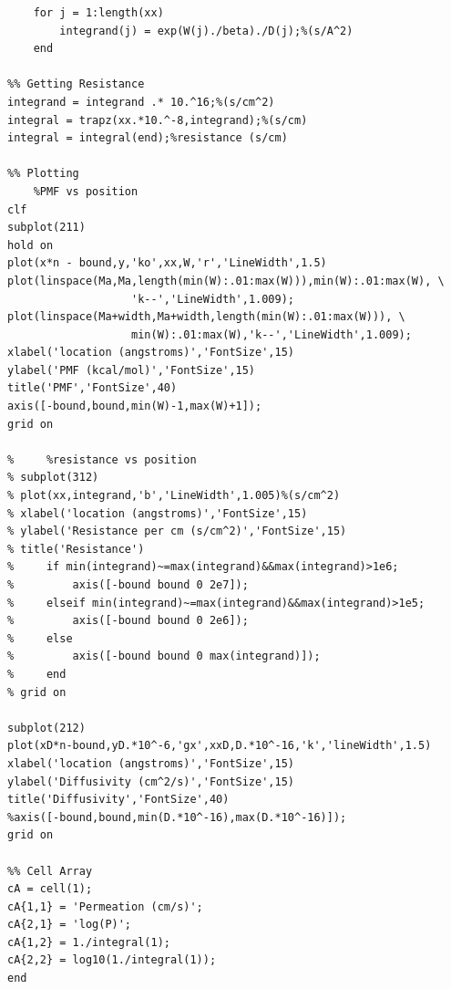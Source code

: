 \documentclass[usetitle=true,journal=jcisd8,manuscript=suppinfo,biochem=true]{achemso}
\begin{document}
\begin{verbatim}
    for j = 1:length(xx)
        integrand(j) = exp(W(j)./beta)./D(j);%(s/A^2)
    end

%% Getting Resistance    
integrand = integrand .* 10.^16;%(s/cm^2)
integral = trapz(xx.*10.^-8,integrand);%(s/cm)
integral = integral(end);%resistance (s/cm)

%% Plotting
    %PMF vs position
clf
subplot(211)
hold on
plot(x*n - bound,y,'ko',xx,W,'r','LineWidth',1.5)
plot(linspace(Ma,Ma,length(min(W):.01:max(W))),min(W):.01:max(W), \
                   'k--','LineWidth',1.009);
plot(linspace(Ma+width,Ma+width,length(min(W):.01:max(W))), \
                   min(W):.01:max(W),'k--','LineWidth',1.009);
xlabel('location (angstroms)','FontSize',15)
ylabel('PMF (kcal/mol)','FontSize',15)
title('PMF','FontSize',40)
axis([-bound,bound,min(W)-1,max(W)+1]);
grid on

%     %resistance vs position
% subplot(312)
% plot(xx,integrand,'b','LineWidth',1.005)%(s/cm^2)
% xlabel('location (angstroms)','FontSize',15)
% ylabel('Resistance per cm (s/cm^2)','FontSize',15)
% title('Resistance')
%     if min(integrand)~=max(integrand)&&max(integrand)>1e6;
%         axis([-bound bound 0 2e7]);
%     elseif min(integrand)~=max(integrand)&&max(integrand)>1e5;
%         axis([-bound bound 0 2e6]);
%     else
%         axis([-bound bound 0 max(integrand)]);
%     end
% grid on

subplot(212)
plot(xD*n-bound,yD.*10^-6,'gx',xxD,D.*10^-16,'k','lineWidth',1.5)
xlabel('location (angstroms)','FontSize',15)
ylabel('Diffusivity (cm^2/s)','FontSize',15)
title('Diffusivity','FontSize',40)
%axis([-bound,bound,min(D.*10^-16),max(D.*10^-16)]);
grid on

%% Cell Array
cA = cell(1);
cA{1,1} = 'Permeation (cm/s)';
cA{2,1} = 'log(P)';
cA{1,2} = 1./integral(1);
cA{2,2} = log10(1./integral(1));
end
\end{verbatim}

\clearpage


\end{document}
